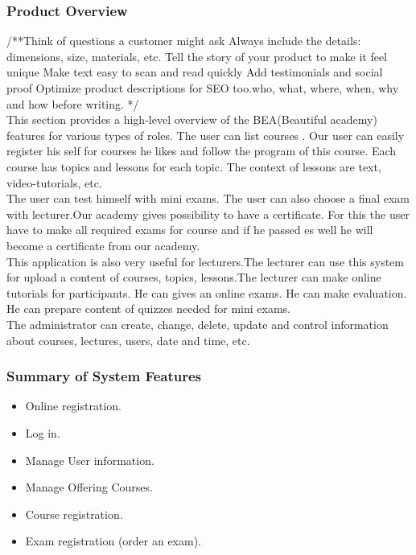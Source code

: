 \documentclass{scrartcl}
\begin{document}
  	\subsubsection{Product Overview}
  	/**Think of questions a customer might ask
Always include the details: dimensions, size, materials, etc.
Tell the story of your product to make it feel unique
Make text easy to scan and read quickly
Add testimonials and social proof
Optimize product descriptions for SEO too.who, what, where, when, why and how before writing. */\\
  	This  section provides a high-level overview of the BEA(Beautiful academy) features for various types of roles.
 The user can list courses . 
 Our user can easily register his self for courses he likes and follow the program of this course. Each course has topics and lessons for each topic. The context of lessons are text, video-tutorials, etc. \\
  	The user can test himself with mini exams. The user can also choose a final exam with lecturer.Our academy gives possibility to have a certificate. For this the user have to make all required exams for course and if he passed es well he will become a certificate from our academy. \\
  	This application is also very useful for lecturers.The lecturer can use this system for upload a content of courses, topics, lessons.The lecturer can make online tutorials for participants. He can gives an online exams. He can make evaluation. He can prepare content of quizzes needed for mini exams.\\
  	The administrator can create, change, delete, update and control information about courses, lectures, users, date and time, etc.
  	
  	
  	\subsubsection{Summary of System Features}
  	
  	\begin{itemize}
  	\item Online registration.
  	\item Log in.
  	\item Manage User information.
  	\item Manage Offering Courses.
  	\item Course registration.
  	\item Exam registration (order an exam).
  	\end{itemize}
  	
\end{document}

